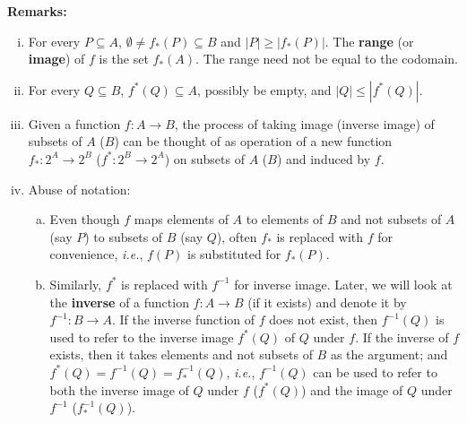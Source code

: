 \documentclass[a4paper,english,12pt]{article}
\begin{document}
\textbf{Remarks:}
\begin{enumerate}[i)]
\item For every $P\subseteq A$, $\emptyset \neq f_*(P)\subseteq B$ and $|P|\geqslant |f_*(P)|$. The \textbf{range} (or \textbf{image}) of $f$ is the set $f_*(A)$. The range need not be equal to the codomain.
\item For every $Q\subseteq B$, $f^*(Q)\subseteq A$, possibly be empty, and $|Q|\leqslant |f^*(Q)|$. 
\item Given a function $f:A\rightarrow B$, the process of taking image (inverse image) of subsets of $A$ ($B$) can be thought of as operation of a new function $f_*:2^A\rightarrow 2^B$ ($f^*:2^B\rightarrow 2^A$) on subsets of $A$ ($B$) and induced by $f$.
\item Abuse of notation: 
\begin{enumerate}[a)]
\item Even though $f$ maps elements of $A$ to elements of $B$ and not subsets of $A$ (say $P$) to subsets of $B$ (say $Q$), often $f_*$ is replaced with $f$ for convenience, \textit{i.e.}, $f(P)$ is substituted for $f_*(P)$.
\item Similarly, $f^*$ is replaced with $f^{-1}$ for inverse image. Later, we will look at the \textbf{inverse} of a function $f:A\rightarrow B$ (if it exists) and denote it by $f^{-1}:B\rightarrow A$. If the inverse function of $f$ does not exist, then $f^{-1}(Q)$ is used to refer to the inverse image $f^*(Q)$ of $Q$ under $f$. If the inverse of $f$ exists, then it takes elements and not subsets of $B$ as the argument; and $f^*(Q)=f^{-1}(Q)=f^{-1}_*(Q)$, \textit{i.e.}, $f^{-1}(Q)$ can be used to refer to both the inverse image of $Q$ under $f$ ($f^*(Q)$) and the image of $Q$ under $f^{-1}$ ($f^{-1}_*(Q)$).
\end{enumerate}
\end{enumerate}
\end{document}
